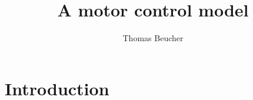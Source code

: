 \documentclass[pdftex,a4paper,11pt]{report}
\begin{document}
\title{A motor control model}
\author{Thomas Beucher}
\maketitle




\chapter{Introduction}
\end{document}
